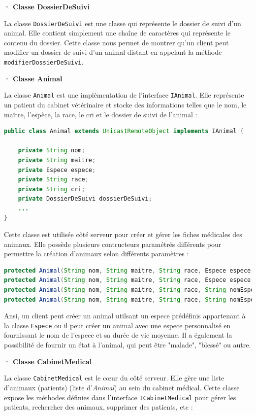 \documentclass{article} %
\begin{document}
\bigskip
\textbf{· Classe DossierDeSuivi}
\bigskip

La classe \texttt{DossierDeSuivi} est une classe qui représente le dossier de suivi 
d'un animal. Elle contient simplement une chaîne de caractères qui représente le 
contenu du dossier. Cette classe nous permet de montrer qu'un client peut modifier
un dossier de suivi d'un animal distant en appelant 
la méthode \texttt{modifierDossierDeSuivi}.

\bigskip
\textbf{· Classe Animal}
\bigskip

La classe \texttt{Animal} est une implémentation de l'interface \texttt{IAnimal}. 
Elle représente un patient du cabinet vétérinaire et stocke des informations telles que le nom, le maître, 
l'espèce, la race, le cri et le dossier de suivi de l'animal :
\begin{lstlisting}[language=Java]
public class Animal extends UnicastRemoteObject implements IAnimal {

	private String nom;
	private String maitre;
	private Espece espece;
	private String race;
	private String cri;
	private DossierDeSuivi dossierDeSuivi;
    ...
}
\end{lstlisting}


Cette classe est utilisée côté serveur 
pour créer et gérer les fiches médicales des animaux.
Elle possède plusieurs contructeurs paramétrés différents pour permettre la création d'animaux
selon différents paramètres : 

\begin{lstlisting}[language=Java]
protected Animal(String nom, String maitre, String race, Espece espece, String cri) {...}
protected Animal(String nom, String maitre, String race, Espece espece, String cri, String etat) {...}
protected Animal(String nom, String maitre, String race, String nomEspece, int dureeDeVieMoyenne, String cri) {...}
protected Animal(String nom, String maitre, String race, String nomEspece, int dureeDeVieMoyenne, String cri, String etat) {...}
\end{lstlisting}

Ansi, un client peut créer un animal utilsant un espece prédéfinis appartenant à la classe \texttt{Espece} ou
il peut créer un animal avec une espece personnalisé en fournissant le nom de l'espece et sa durée de vie moyenne.
Il a également la possibilité de fournir un état à l'animal, qui peut être "malade", "blessé" ou autre.

\bigskip
\textbf{· Classe CabinetMedical}
\bigskip


La classe \texttt{CabinetMedical} est le cœur du côté serveur. 
Elle gère une liste d'animaux (patients) (liste d'\textit{Animal}) au sein du cabinet médical. 
Cette classe expose les méthodes définies dans l'interface \texttt{ICabinetMedical} pour gérer les patients, 
rechercher des animaux, supprimer des patients, etc : 
\end{document}
